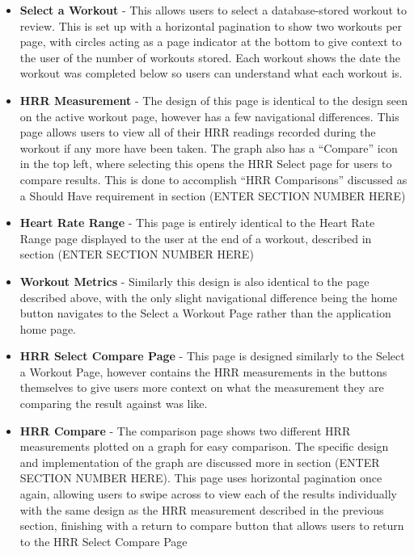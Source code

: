 \documentclass{l4proj}
\begin{document}
\begin{itemize}
    \item \textbf{Select a Workout} - This allows users to select a database-stored workout to review. This is set up with a horizontal pagination to show two workouts per page, with circles acting as a page indicator at the bottom to give context to the user of the number of workouts stored. Each workout shows the date the workout was completed below so users can understand what each workout is.
    \item \textbf{HRR Measurement} - The design of this page is identical to the design seen on the active workout page, however has a few navigational differences. This page allows users to view all of their HRR readings recorded during the workout if any more have been taken. The graph also has a “Compare” icon in the top left, where selecting this opens the HRR Select page for users to compare results. This is done to accomplish “HRR Comparisons” discussed as a Should Have requirement in section (ENTER SECTION NUMBER HERE)
    \item \textbf{Heart Rate Range} - This page is entirely identical to the Heart Rate Range page displayed to the user at the end of a workout, described in section (ENTER SECTION NUMBER HERE)
    \item \textbf{Workout Metrics} - Similarly this design is also identical to the page described above, with the only slight navigational difference being the home button navigates to the Select a Workout Page rather than the application home page.
    \item \textbf{HRR Select Compare Page} - This page is designed similarly to the Select a Workout Page, however contains the HRR measurements in the buttons themselves to give users more context on what the measurement they are comparing the result against was like.
    \item \textbf{HRR Compare} - The comparison page shows two different HRR measurements plotted on a graph for easy comparison. The specific design and implementation of the graph are discussed more in section (ENTER SECTION NUMBER HERE). This page uses horizontal pagination once again, allowing users to swipe across to view each of the results individually with the same design as the HRR measurement described in the previous section, finishing with a return to compare button that allows users to return to the  HRR Select Compare Page
\end{itemize}
\end{document}
